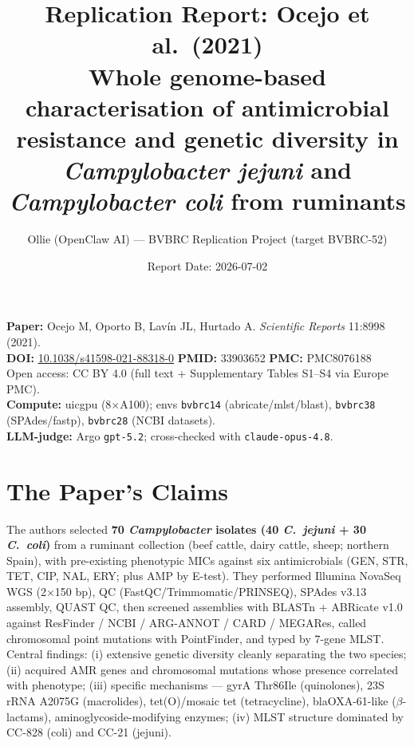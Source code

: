 \documentclass[11pt,a4paper]{article}
\title{Replication Report: Ocejo et al.\ (2021)\\
\large Whole genome-based characterisation of antimicrobial resistance and genetic diversity in \textit{Campylobacter jejuni} and \textit{Campylobacter coli} from ruminants}
\author{Ollie (OpenClaw AI) --- BVBRC Replication Project (target BVBRC-52)}
\date{Report Date: 2026-07-02}
\begin{document}
\maketitle

\begin{center}
\textbf{Paper:} Ocejo M, Oporto B, Lav\'in JL, Hurtado A. \textit{Scientific Reports} 11:8998 (2021).\\
\textbf{DOI:} \href{https://doi.org/10.1038/s41598-021-88318-0}{10.1038/s41598-021-88318-0} \quad
\textbf{PMID:} 33903652 \quad \textbf{PMC:} PMC8076188\\
Open access: CC BY 4.0 (full text + Supplementary Tables S1--S4 via Europe PMC).\\
\textbf{Compute:} uicgpu (8$\times$A100); envs \texttt{bvbrc14} (abricate/mlst/blast), \texttt{bvbrc38} (SPAdes/fastp), \texttt{bvbrc28} (NCBI datasets).\\
\textbf{LLM-judge:} Argo \texttt{gpt-5.2}; cross-checked with \texttt{claude-opus-4.8}.
\end{center}

\vspace{0.5em}
\noindent{}

\section{The Paper's Claims}

The authors selected \textbf{70 \textit{Campylobacter} isolates (40 \textit{C.\ jejuni} + 30 \textit{C.\ coli})} from a ruminant collection (beef cattle, dairy cattle, sheep; northern Spain), with pre-existing phenotypic MICs against six antimicrobials (GEN, STR, TET, CIP, NAL, ERY; plus AMP by E-test). They performed Illumina NovaSeq WGS (2$\times$150 bp), QC (FastQC/Trimmomatic/PRINSEQ), SPAdes v3.13 assembly, QUAST QC, then screened assemblies with BLASTn + ABRicate v1.0 against ResFinder / NCBI / ARG-ANNOT / CARD / MEGARes, called chromosomal point mutations with PointFinder, and typed by 7-gene MLST. Central findings: (i) extensive genetic diversity cleanly separating the two species; (ii) acquired AMR genes and chromosomal mutations whose presence correlated with phenotype; (iii) specific mechanisms --- gyrA Thr86Ile (quinolones), 23S rRNA A2075G (macrolides), tet(O)/mosaic tet (tetracycline), blaOXA-61-like (\(\beta\)-lactams), aminoglycoside-modifying enzymes; (iv) MLST structure dominated by CC-828 (coli) and CC-21 (jejuni).
\end{document}
